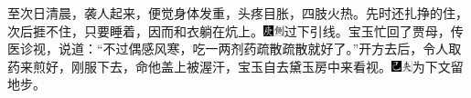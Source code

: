 至次日清晨，袭人起来，便觉身体发重，头疼目胀，四肢火热。先时还扎挣的住，次后捱不住，只要睡着，因而和衣躺在炕上。{\includegraphics[width=3mm]{../Images/00004}\includegraphics[width=3mm]{../Images/00011}\footnotesize \kaishu 过下引线。}宝玉忙回了贾母，传医诊视，说道：“不过偶感风寒，吃一两剂药疏散疏散就好了。”开方去后，令人取药来煎好，刚服下去，命他盖上被渥汗，宝玉自去黛玉房中来看视。{\includegraphics[width=3mm]{../Images/00003}\includegraphics[width=3mm]{../Images/00012}\footnotesize \kaishu 为下文留地步。}

